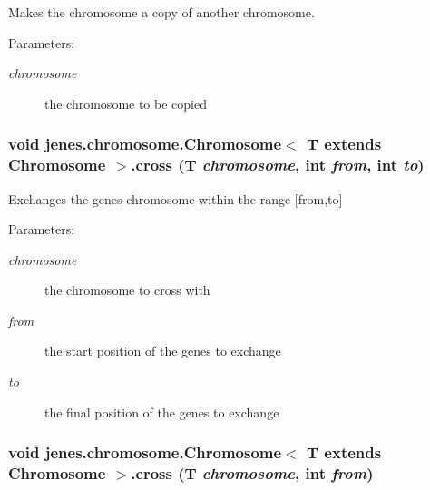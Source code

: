 Makes the chromosome a copy of another chromosome. 

\begin{Desc}
\item[Parameters:]
\begin{description}
\item[{\em chromosome}]the chromosome to be copied \end{description}
\end{Desc}
\hypertarget{interfacejenes_1_1chromosome_1_1_chromosome_3_01_t_01extends_01_chromosome_01_4_3865a9034e0582dc11b6dc6cbd9b21da}{
\subsubsection[cross]{\setlength{\rightskip}{0pt plus 5cm}void jenes.chromosome.Chromosome$<$ T extends Chromosome $>$.cross (T {\em chromosome}, \/  int {\em from}, \/  int {\em to})}}
\label{interfacejenes_1_1chromosome_1_1_chromosome_3_01_t_01extends_01_chromosome_01_4_3865a9034e0582dc11b6dc6cbd9b21da}


Exchanges the genes chromosome within the range \mbox{[}from,to\mbox{]} 

\begin{Desc}
\item[Parameters:]
\begin{description}
\item[{\em chromosome}]the chromosome to cross with \item[{\em from}]the start position of the genes to exchange \item[{\em to}]the final position of the genes to exchange \end{description}
\end{Desc}
\hypertarget{interfacejenes_1_1chromosome_1_1_chromosome_3_01_t_01extends_01_chromosome_01_4_56f3d45ef9dced649f9050d736e6e753}{
\subsubsection[cross]{\setlength{\rightskip}{0pt plus 5cm}void jenes.chromosome.Chromosome$<$ T extends Chromosome $>$.cross (T {\em chromosome}, \/  int {\em from})}}
\label{interfacejenes_1_1chromosome_1_1_chromosome_3_01_t_01extends_01_chromosome_01_4_56f3d45ef9dced649f9050d736e6e753}


